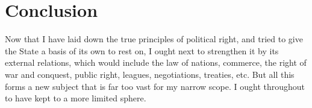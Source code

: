 \documentclass[12pt]{report}
\begin{document}
\section{Conclusion}
Now that I have laid down the true principles of political right, and tried to give the State a basis of its own to rest on, I ought next to strengthen it by its external relations, which would include the law of nations, commerce, the right of war and conquest, public right, leagues, negotiations, treaties, etc. But all this forms a new subject that is far too vast for my narrow scope. I ought throughout to have kept to a more limited sphere.
\end{document}
